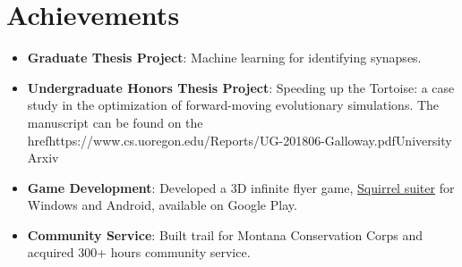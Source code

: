 \documentclass[letterpaper,9pt]{article}
\newcommand{\resumeNoWrapItem}[2]{
  \item\small{
    \textbf{#1}{: #2 \vspace{-2pt}}
  }
}
\newcommand{\resumeSubItem}[2]{\resumeNoWrapItem{#1}{#2}\vspace{-2pt}}
\newcommand{\resumeSubHeadingListStart}{\begin{itemize}[leftmargin=*]}
\newcommand{\resumeSubHeadingListEnd}{\end{itemize}}
\begin{document}
\section{Achievements}

\resumeSubHeadingListStart
    \resumeSubItem{Graduate Thesis Project}
    {
        Machine learning for identifying synapses.
    }
    \resumeSubItem{Undergraduate Honors Thesis Project}
    {
        Speeding up the Tortoise: a case study in the optimization of forward-moving evolutionary simulations.
        The manuscript can be found on the 
        href{https://www.cs.uoregon.edu/Reports/UG-201806-Galloway.pdf}{University Arxiv}
    }
    \resumeSubItem{Game Development}
    {
        Developed a 3D infinite flyer game,
        \href{https://play.google.com/store/apps/details?id=com.Nighthawks.SquirrelSuiter&hl=en_US}{Squirrel suiter} for Windows and Android, available on Google Play.
    }
    \resumeSubItem{Community Service}
    {
        Built trail for Montana Conservation Corps and acquired 300+
        hours community service.
    }

\resumeSubHeadingListEnd
\end{document}
